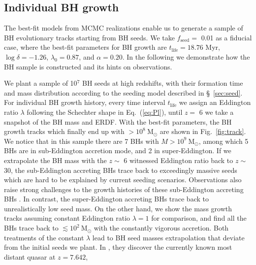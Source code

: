 \documentclass[nolinenumbers,preprint2,tighten]{aastex631}
\newcommand{\Msun}{\mathrm{M_\odot}}
\newcommand{\tlife}{t_\mathrm{life}}
\newcommand{\fseed}{f_\mathrm{seed}}
\newcommand{\blue}[1]{\textcolor{blue}{ #1}}
\begin{document}
\begin{CJK*}{UTF8}{gbsn}
\vspace{2mm}
\subsection{Individual BH growth}\label{sec:evol}
The best-fit models from MCMC realizations enable us to generate a sample of BH evolutionary tracks starting from BH seeds.
We take $\fseed=$ 0.01 as a fiducial case, where the best-fit parameters for BH growth are 
$\tlife=18.76$ Myr, $\log\delta=-1.26$, $\lambda_0=0.87$, and $\alpha=0.20$.
In the following we demonstrate how the BH sample is constructed and its hints on observations.

We plant a sample of 10$^7$ BH seeds at high redshifts, 
with their formation time and mass distribution according to the seeding model described in \S~\ref{sec:seed}. 
For individual BH growth history, every time interval $\tlife$ we assign an Eddington ratio 
$\lambda$ following the Schechter shape in Eq.~(\ref{eq:Pl}), 
until $z=$ 6 we take a snapshot of the BH mass and ERDF.
With the best-fit parameters, the BH growth tracks which finally end up with $>10^8~\Msun$ 
are shown in Fig.~\ref{fig:track}. 
We notice that in this sample there are 7 BHs with $M>10^9~\Msun$, 
among which 5 BHs are in sub-Eddington accretion mode, and 2 in super-Eddington. 
If we extrapolate the BH mass with the $z \sim$ 6 witnessed Eddington ratio back to $z\sim$ 30, 
the sub-Eddington accreting BHs trace back to exceedingly massive seeds which are hard to be explained by current seeding scenarios. 
Observations also raise strong challenges to the growth histories of these sub-Eddington accreting BHs
\citep[e.g.,][]{2019ApJ...880...77O}.
In contrast, the super-Eddington accreting BHs trace back to unrealistically low seed mass. 
On the other hand, we show the mass growth tracks assuming constant Eddington ratio $\lambda=1$ for comparison, 
and find all the BHs trace back to $\lesssim 10^2~\Msun$ with the constantly vigorous accretion. 
Both treatments of the constant $\lambda$ lead to BH seed masses extrapolation that deviate from the initial seeds we plant. 
In \citet{2021ApJ...907L...1W}, they discover the currently known most distant quasar at $z=7.642$, 

\end{CJK*}
\end{document}
